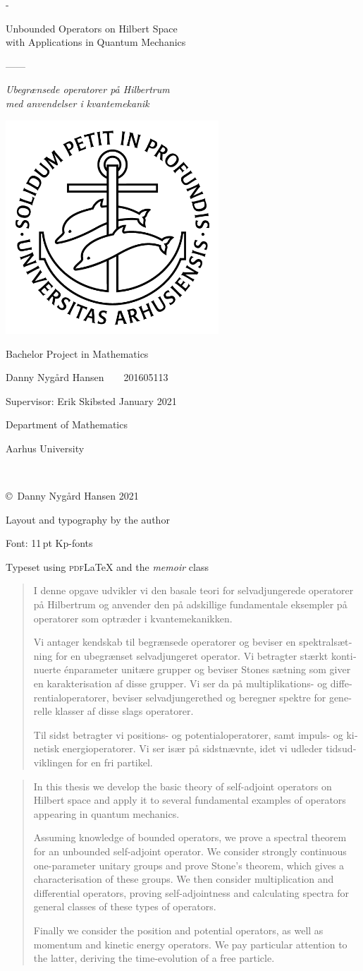 \documentclass[article, a4paper, 11pt, oneside]{memoir}
\numberwithin{equation}{chapter}
\theoremstyle{myexample}
\theoremstyle{myexample}
\theoremstyle{myexamplebreak}
\theoremstyle{myexamplebreak}
\theoremstyle{nonumberplain}
\theoremstyle{MyNonumberplain}
\renewcommand{\maketitle}{
\begin{titlingpage*}
	\calccentering{\unitlength}
	\begin{adjustwidth*}{\unitlength}{-\unitlength}
		\begin{adjustwidth}{-0.5cm}{-0.5cm}
		\centering
		\thispagestyle{empty}
		{%
			\large%
			{\LARGE Unbounded Operators on Hilbert Space \\ with Applications in Quantum Mechanics}\par
			\vspace*{0.5\onelineskip}%
			------\par%
			\vspace*{0.5\onelineskip}%
			{\itshape Ubegrænsede operatorer på Hilbertrum \\ med anvendelser i kvantemekanik}\par
			\vspace*{4\onelineskip}\par
			\includegraphics[width=8cm]{ausegl_sort.png}\par
			\vspace*{4\onelineskip}%
			Bachelor Project in Mathematics\par
			Danny Nygård Hansen~~{\footnotesize\textbullet}~~201605113\par
		}%
		\vfill
		\vspace*{2\onelineskip}
		Supervisor: Erik Skibsted\hfill
		January 2021\par
		\vspace*{2\onelineskip}%
		\small%
		Department of Mathematics\par
		Aarhus University\par~\par
		\enlargethispage{2\onelineskip}
		\end{adjustwidth}
	\end{adjustwidth*}
	\newpage
    \thispagestyle{empty}
    \small%
    \strut\vfill
    \begin{flushleft}
    	\copyright\ Danny Nygård Hansen 2021 \par
    	Layout and typography by the author \par
    	Font: 11\,pt Kp-fonts\par%
    	Typeset using \textsc{pdf}\LaTeX{} and the \emph{memoir} class \par
    \end{flushleft}
    \newpage
\end{titlingpage*}
}
\begin{document}
\frontmatter

\maketitle

\begin{otherlanguage}{danish}
\begin{abstract}
    \noindent I denne opgave udvikler vi den basale teori for selvadjungerede operatorer på Hilbertrum og anvender den på adskillige fundamentale eksempler på operatorer som optræder i kvantemekanikken.
    
    Vi antager kendskab til begrænsede operatorer og beviser en spektralsætning for en ubegrænset selvadjungeret operator. Vi betragter stærkt kontinuerte énparameter unitære grupper og beviser Stones sætning som giver en karakterisation af disse grupper. Vi ser da på multiplikations- og differentialoperatorer, beviser selvadjungerethed og beregner spektre for generelle klasser af disse slags operatorer.
    
    Til sidst betragter vi positions- og potentialoperatorer, samt impuls- og kinetisk energioperatorer. Vi ser især på sidstnævnte, idet vi udleder tidsudviklingen for en fri partikel.
\end{abstract}
\end{otherlanguage}
\begin{abstract}
    \noindent In this thesis we develop the basic theory of self-adjoint operators on Hilbert space and apply it to several fundamental examples of operators appearing in quantum mechanics.
    
    Assuming knowledge of bounded operators, we prove a spectral theorem for an unbounded self-adjoint operator. We consider strongly continuous one-parameter unitary groups and prove Stone's theorem, which gives a characterisation of these groups. We then consider multiplication and differential operators, proving self-adjointness and calculating spectra for general classes of these types of operators.
    
    Finally we consider the position and potential operators, as well as momentum and kinetic energy operators. We pay particular attention to the latter, deriving the time-evolution of a free particle.
\end{abstract}

\newpage

\tableofcontents
\newpage

\newcommand{\borel}{\mathfrak{B}}
\newcommand{\measurable}{\mathcal{M}}
\newcommand{\simplemeas}{\mathcal{S\!M}}
\newcommand{\boundedop}{\mathcal{B}}
\newcommand{\graph}{\mathcal{G}}
\end{document}
